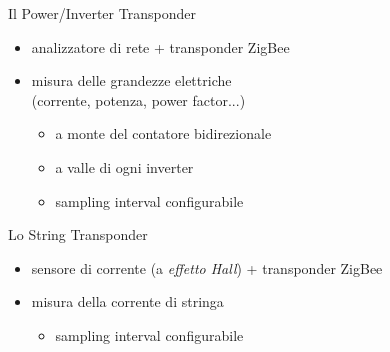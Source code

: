 \documentclass{beamer}
\newcommand{\red}[1]{\textcolor[rgb]{.8,0,0}{#1}}
\begin{document}
%
\begin{frame}{Il Power/Inverter Transponder}
\begin{figure}[!h]
  \begin{center}
  \end{center}
\end{figure}
%
\begin{itemize}
\item \red{analizzatore di rete} + \red{transponder ZigBee}
\item misura delle grandezze elettriche \\ (corrente, potenza, power factor...)
  \begin{itemize}
  \item a monte del contatore bidirezionale
  \item a valle di ogni inverter
  \item \red{sampling interval} configurabile
  \end{itemize}
\end{itemize}
%
\end{frame}
%

%
\begin{frame}{Lo String Transponder}
\begin{figure}[!h]
  \begin{center}
  \end{center}
\end{figure}
%
\begin{itemize}
\item \red{sensore di corrente} (a \emph{effetto Hall}) + \red{transponder ZigBee}
\item misura della corrente di stringa
  \begin{itemize}
  \item \red{sampling interval} configurabile  
  \end{itemize}
  \end{itemize}
\end{frame}
%
\end{document}
